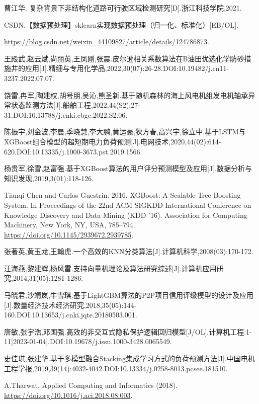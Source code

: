 \documentclass{MathorCupmodeling}
\begin{document}
	\begin{spacing}{1.08}
	\begin{thebibliography}{99}
	曹江华. 复杂背景下非结构化道路可行驶区域检测研究[D].浙江科技学院,2021.

	CSDN.【数据预处理】sklearn实现数据预处理（归一化、标准化）[EB/OL].
	
	\url{https://blog.csdn.net/weixin_44109827/article/details/124786873}.


	王殿武,赵云斌,尚丽英,王凤刚,张震.皮尔逊相关系数算法在B油田优选化学防砂措施井的应用[J].精细与专用化学品,2022,30(07):26-28.DOI:10.19482/j.cn11-3237.2022.07.07.

	饶雷,冉军,陶建权,胡号朋,吴沁,熊圣新.基于随机森林的海上风电机组发电机轴承异常状态监测方法[J].船舶工程,2022,44(S2):27-31.DOI:10.13788/j.cnki.cbgc.2022.S2.06.

	陈振宇,刘金波,李晨,季晓慧,李大鹏,黄运豪,狄方春,高兴宇,徐立中.基于LSTM与XGBoost组合模型的超短期电力负荷预测[J].电网技术,2020,44(02):614-620.DOI:10.13335/j.1000-3673.pst.2019.1566.

	杨贵军,徐雪,赵富强.基于XGBoost算法的用户评分预测模型及应用[J].数据分析与知识发现,2019,3(01):118-126.

	Tianqi Chen and Carlos Guestrin. 2016. XGBoost: A Scalable Tree Boosting System. In Proceedings of the 22nd ACM SIGKDD International Conference on Knowledge Discovery and Data Mining (KDD '16). Association for Computing Machinery, New York, NY, USA, 785–794. \url{https://doi.org/10.1145/2939672.2939785}.

	张著英,黄玉龙,王翰虎.一个高效的KNN分类算法[J].计算机科学,2008(03):170-172.

	汪海燕,黎建辉,杨风雷.支持向量机理论及算法研究综述[J].计算机应用研究,2014,31(05):1281-1286.

	马晓君,沙靖岚,牛雪琪.基于LightGBM算法的P2P项目信用评级模型的设计及应用[J].数量经济技术经济研究,2018,35(05):144-160.DOI:10.13653/j.cnki.jqte.20180503.001.

	唐敏,张宇浩,邓国强.高效的非交互式隐私保护逻辑回归模型[J/OL].计算机工程:1-11[2023-01-04].DOI:10.19678/j.issn.1000-3428.0065549.

	史佳琪,张建华.基于多模型融合Stacking集成学习方式的负荷预测方法[J].中国电机工程学报,2019,39(14):4032-4042.DOI:10.13334/j.0258-8013.pcsee.181510.

	A.Tharwat, Applied Computing and Informatics (2018). \url{https://doi.org/10.1016/j.aci.2018.08.003}.
	\end{thebibliography}
	\end{spacing}
	\newpage
\end{document}
